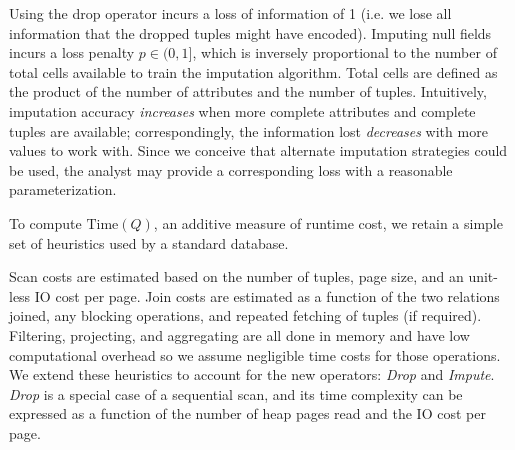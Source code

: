 Using the drop operator incurs a loss of information of 1 (i.e. we lose all information that
the dropped tuples might have encoded). Imputing null fields incurs a loss penalty $p \in (0, 1]$,
which is inversely proportional to the number of total cells available to train the imputation algorithm. 
Total cells are defined as the product of the number of attributes and the number of tuples.
Intuitively, imputation
accuracy \textit{increases} when more complete attributes and complete tuples are available;
correspondingly, the information lost \textit{decreases} with more values to work
with. Since we conceive that
alternate imputation strategies could be used, the analyst may provide a corresponding
loss with a reasonable parameterization.

To compute $\text{Time}(Q)$, an additive measure of runtime cost, we retain a simple set of heuristics used by a standard 
database. 


Scan costs are estimated based on the number of tuples, 
page size, and an unit-less IO cost per page. Join costs are estimated as a function
of the two relations joined, any blocking operations, and repeated fetching of tuples (if required).
Filtering, projecting, and aggregating are all done in memory and have low computational overhead
so we assume negligible time costs for those operations. We extend these heuristics to 
account for the new operators: \textit{Drop} and \textit{Impute}. \textit{Drop} is a special case of a sequential scan, and its time
complexity can be expressed as a function of the number of heap pages read and the IO cost
per page.

